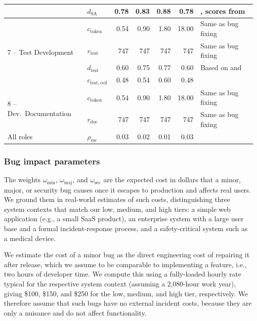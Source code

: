 \documentclass[smallextended]{svjour3}       %
\begin{document}
\begin{table}[t]
\begin{tabularx}{\linewidth}{p{2.2cm}p{1.5cm}rrrrX}
  & $d_\mathrm{SA}$        & 0.78 & 0.83 & 0.88  & 0.78   & \cite{liu2024cyberbench}, scores from \cite{valsai2026swebench} \\
\midrule
\multirow{4}{2.2cm}{7 -- Test Development}
  & $c_\mathrm{token}$     & 0.54 & 0.90 & 1.80 & 18.00 & Same as bug fixing \\
  & $r_\mathrm{test}$      & 747  & 747  & 747  & 747   & Same as bug fixing \\
  & $d_\mathrm{test}$      & 0.60 & 0.75 & 0.77 & 0.60  & Based on \cite{huang2025benchmarking} and \cite{valsai2026swebench} \\
  & $c_\mathrm{test,ceil}$ & 0.48 & 0.54 & 0.60 & 0.48  & \cite{SCHWARTZ2018106} \\
\midrule
\multirow{2}{2.2cm}{8 -- Dev.\ Documentation}
  & $c_\mathrm{token}$     & 0.54 & 0.90 & 1.80 & 18.00 & Same as bug fixing \\
  & $r_\mathrm{doc}$       & 747  & 747  & 747  & 747   & Same as bug fixing \\
\midrule
All roles & $\rho_\mathrm{esc}$ & 0.03 & 0.02 & 0.01 & 0.03 & \cite{baumann2026swechat} \\
\bottomrule
\end{tabularx}
\end{table}


\subsubsection{Bug impact parameters}
\label{sec:scenario:bugimpact}

The weights $\omega_\mathrm{min}$, $\omega_\mathrm{maj}$, and $\omega_\mathrm{sec}$ are the expected cost in dollars that a minor, major, or security bug causes once it escapes to production and affects real users. We ground them in real-world estimates of such costs, distinguishing three system contexts that match our low, medium, and high tiers: a simple web application (e.g., a small SaaS product), an enterprise system with a large user base and a formal incident-response process, and a safety-critical system such as a medical device. 

We estimate the cost of a minor bug as the direct engineering cost of repairing it after release, which we assume to be comparable to implementing a feature, i.e., two hours of developer time. We compute this using a fully-loaded hourly rate typical for the respective system context (assuming a 2{,}080-hour work year), giving \$100, \$150, and \$250 for the low, medium, and high tier, respectively. We therefore assume that such bugs have no external incident costs, because they are only a nuisance and do not affect functionality.
\end{document}
